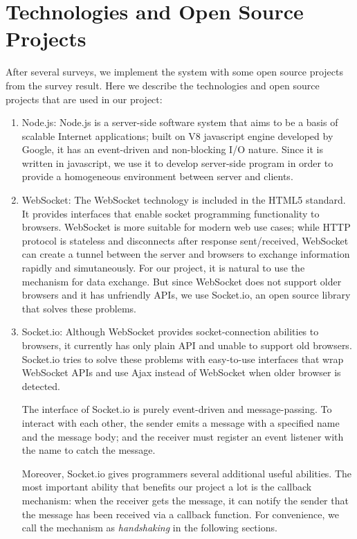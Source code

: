 \section{Technologies and Open Source Projects}

After several surveys, we implement the system with some open source projects from the survey result. Here we describe the technologies and open source projects that are used in our project:

\begin{enumerate}

\item Node.js:
  Node.js is a server-side software system that aims to be a basis of scalable Internet applications; built on V8\cite{v8} javascript engine developed by Google, it has an event-driven and non-blocking I/O nature. Since it is written in javascript, we use it to develop server-side program in order to provide a homogeneous environment between server and clients.

\item WebSocket\cite{websocket}:
  The WebSocket technology is included in the HTML5 standard. It provides interfaces that enable socket programming functionality to browsers.
  WebSocket is more suitable for modern web use cases; while HTTP protocol is stateless and disconnects after response sent/received, WebSocket can create a tunnel between the server and browsers to exchange information rapidly and simutaneously.
  For our project, it is natural to use the mechanism for data exchange. But since WebSocket does not support older browsers and it has unfriendly APIs, we use Socket.io, an open source library that solves these problems.

\item Socket.io\cite{socketio}:
  Although WebSocket provides socket-connection abilities to browsers, it currently has only plain API and unable to support old browsers. Socket.io tries to solve these problems with easy-to-use interfaces that wrap WebSocket APIs and use Ajax instead of WebSocket when older browser is detected.

  The interface of Socket.io is purely event-driven and message-passing. To interact with each other, the sender emits a message with a specified name and the message body; and the receiver must register an event listener with the name to catch the message.

  Moreover, Socket.io gives programmers several additional useful abilities. The most important ability that benefits our project a lot is the callback mechanism: when the receiver gets the message, it can notify the sender that the message has been received via a callback function. For convenience, we call the mechanism as \emph{handshaking} in the following sections. 


\end{enumerate}
